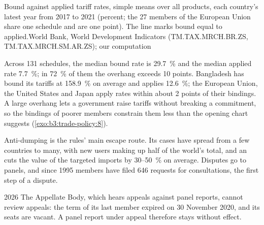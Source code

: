 \begin{omchart}{Bound against applied tariff rates, simple means over all products,
each country's latest year from 2017 to 2021 (percent; the 27 members of the
European Union share one schedule and are one point). The line marks bound equal
to applied.}{World Bank, World Development Indicators (TM.TAX.MRCH.BR.ZS,
TM.TAX.MRCH.SM.AR.ZS); our computation}
\end{omchart}

Across 131 schedules, the median bound rate is 29.7~\% and the median applied rate
7.7~\%; in 72~\% of them the overhang exceeds 10 points. Bangladesh has bound its
tariffs at 158.9~\% on average and applies 12.6~\%; the European Union, the United
States and Japan apply rates within about 2 points of their bindings. A large
overhang lets a government raise tariffs without breaking a commitment, so the
bindings of poorer members constrain them less than the opening chart suggests
(\cref{exo:b3:trade-policy:8}).

Anti-dumping is the rules' main escape route. Its cases have spread from a few
countries to many, with new users making up half of the world's total, and an
 cuts the value of the targeted imports by 30--50~\% on average.
Disputes go to panels, and since 1995 members have filed 646 requests for
consultations, the first step of a dispute.

\begin{dated}{2026}
The Appellate Body, which hears appeals against panel reports, cannot review
appeals: the term of its last member expired on 30 November 2020, and its seats
are vacant. A panel report under appeal therefore stays without effect.
\end{dated}

